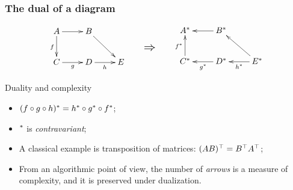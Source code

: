 \documentclass[10pt,usepdftitle=false]{beamer}
\begin{document}

\begin{frame}
  \frametitle{The dual of a diagram}
  
  \[\vcenter{\xymatrix{
    A \ar[r]\ar[d]_f & B\ar[dr] \\
    C \ar[r]_g & D\ar[r]_h & E
  }}
  \qquad
  \text{\Large$\Rightarrow$}
  \qquad
  \vcenter{\xymatrix{
    \dual{A} \ar@{<-}[r]\ar@{<-}[d]_{\dual{f}} & \dual{B}\ar@{<-}[dr] \\
    \dual{C} \ar@{<-}[r]_{\dual{g}} & \dual{D}\ar@{<-}[r]_{\dual{h}} & \dual{E}
  }}\]
  
  \begin{block}{Duality and complexity}
    \begin{itemize}
    \item $(f\circ g\circ h)^\ast = h^\ast\circ g^\ast\circ f^\ast$;
    \item $^\ast$ is \emph{contravariant};
    \item A classical example is transposition of matrices: $(AB)^\top=B^\top A^\top$;
    \item From an algorithmic point of view, the \alert{number of
        \emph{arrows}} is a measure of complexity, and it is
      \alert{preserved} under dualization.
    \end{itemize}
  \end{block}
\end{frame}

\end{document}
